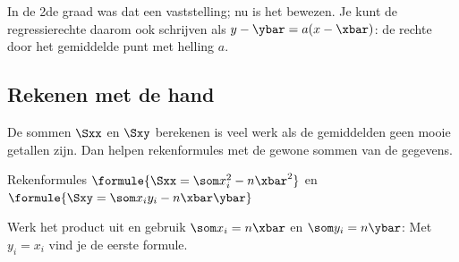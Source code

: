 In de 2de graad was dat een vaststelling; nu is het bewezen. Je kunt de regressierechte daarom ook schrijven als $y - \ybar = a(x - \xbar)$: de rechte door het gemiddelde punt met helling $a$.

\subsection{Rekenen met de hand}

De sommen $\Sxx$ en $\Sxy$ berekenen is veel werk als de gemiddelden geen mooie getallen zijn. Dan helpen rekenformules met de gewone sommen van de gegevens.

\begin{theorie}
\begin{stelling}{Rekenformules}
\qquad $\formule{\Sxx = \som x_i^2 - n\xbar^2}$ \quad en \quad $\formule{\Sxy = \som x_i y_i - n\xbar\ybar}$
\end{stelling}

\begin{bewijs}
Werk het product uit en gebruik $\som x_i = n\xbar$ en $\som y_i = n\ybar$:
Met $y_i = x_i$ vind je de eerste formule.
\end{bewijs}
\end{theorie}

